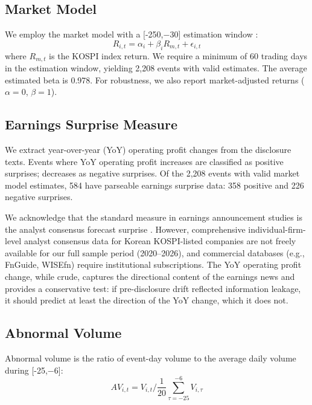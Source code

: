 \documentclass[review,authoryear]{elsarticle}
\begin{document}
\subsection{Market Model}

We employ the market model with a [-250,$-$30] estimation window \citep{mackinlay1997event}:
\begin{equation}
R_{i,t} = \alpha_i + \beta_i R_{m,t} + \epsilon_{i,t}
\end{equation}
where $R_{m,t}$ is the KOSPI index return. We require a minimum of 60 trading days in the estimation window, yielding 2,208 events with valid estimates. The average estimated beta is 0.978. For robustness, we also report market-adjusted returns ($\alpha=0$, $\beta=1$).

\subsection{Earnings Surprise Measure}

We extract year-over-year (YoY) operating profit changes from the disclosure texts. Events where YoY operating profit increases are classified as positive surprises; decreases as negative surprises. Of the 2,208 events with valid market model estimates, 584 have parseable earnings surprise data: 358 positive and 226 negative surprises.

We acknowledge that the standard measure in earnings announcement studies is the analyst consensus forecast surprise \citep{livnat2006comparing}. However, comprehensive individual-firm-level analyst consensus data for Korean KOSPI-listed companies are not freely available for our full sample period (2020--2026), and commercial databases (e.g., FnGuide, WISEfn) require institutional subscriptions. The YoY operating profit change, while crude, captures the directional content of the earnings news and provides a conservative test: if pre-disclosure drift reflected information leakage, it should predict at least the direction of the YoY change, which it does not.

\subsection{Abnormal Volume}

Abnormal volume is the ratio of event-day volume to the average daily volume during [-25,$-$6]:
\begin{equation}
AV_{i,t} = V_{i,t} \bigg/ \frac{1}{20}\sum_{\tau=-25}^{-6} V_{i,\tau}
\end{equation}
\end{document}
